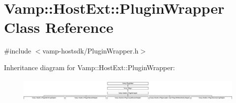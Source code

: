 \hypertarget{class_vamp_1_1_host_ext_1_1_plugin_wrapper}{}\section{Vamp\+:\+:Host\+Ext\+:\+:Plugin\+Wrapper Class Reference}
\label{class_vamp_1_1_host_ext_1_1_plugin_wrapper}


{\ttfamily \#include $<$vamp-\/hostsdk/\+Plugin\+Wrapper.\+h$>$}

Inheritance diagram for Vamp\+:\+:Host\+Ext\+:\+:Plugin\+Wrapper\+:\begin{figure}[H]
\begin{center}
\leavevmode
\includegraphics[height=1.197861cm]{class_vamp_1_1_host_ext_1_1_plugin_wrapper}
\end{center}
\end{figure}

